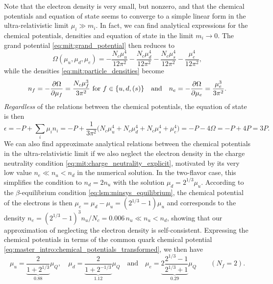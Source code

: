 Note that the electron density is very small, but nonzero,
and that the chemical potentials and equation of state seems to converge to a simple linear form in the ultra-relativistic limit $\mu_i \gg m_i$.
In fact, we can find analytical expressions for the chemical potentials, densities and equation of state in the limit $m_i \rightarrow 0$.
The grand potential \eqref{eq:mit:grand_potential} then reduces to
\begin{equation}
	\Omega(\mu_u, \mu_d, \mu_e) = -\frac{N_c \mu_u^4}{12 \pi^2} - \frac{N_c \mu_d^4}{12 \pi^2} - \frac{N_c \mu_s^4}{12 \pi^2} - \frac{\mu_e^4}{12 \pi^2},
\label{eq:mit:grand_potential_massless}
\end{equation}
while the densities \eqref{eq:mit:particle_densities} become
\begin{equation}
	n_f = -\pdv{\Omega}{\mu_f} = \frac{N_c \mu_f^3}{3 \pi^2}
	\text{ for $f \in \{u,d,(s)\}$}
	\quad \text{and} \quad
	n_e = -\pdv{\Omega}{\mu_e} = \frac{    \mu_e^3}{3 \pi^2}.
\label{eq:lsm:densities_massless}
\end{equation}
\emph{Regardless} of the relations between the chemical potentials,
the equation of state is then
\begin{equation}
	\epsilon = -P + \sum_i \mu_i n_i
	         = -P + \frac{1}{3 \pi^2} \Big(N_c \mu_u^4 + N_c \mu_d^4 + N_c \mu_s^4 + \mu_e^4\Big)
	         = -P - 4 \Omega 
	         = -P + 4 P 
	         = 3 P .
\label{eq:mit:eos_ur}
\end{equation}
We can also find approximate analytical relations between the chemical potentials in the ultra-relativistic limit
if we also neglect the electron density in the charge neutrality condition \eqref{eq:mit:charge_neutrality_explicit},
motivated by its very low value $n_e \ll n_u < n_d$ in the numerical solution.
In the two-flavor case, this simplifies the condition to $n_d = 2 n_u$ with the solution $\mu_d = 2^{1/3} \mu_u$.
According to the $\beta$-equilibrium condition \eqref{eq:lsm:minsys_equilibrium},
the chemical potential of the electrons is then $\mu_e = \mu_d - \mu_u = (2^{1/3}-1) \mu_u$
and corresponds to the density $n_e = (2^{1/3}-1)^3 n_u / N_c = 0.006 \, n_u \ll n_u < n_d$,
showing that our approximation of neglecting the electron density is self-consistent.
Expressing the chemical potentials in terms of the common quark chemical potential \eqref{eq:master_intro:chemical_potentials_transformed},
we then have
\begin{equation}
	\mu_u = \underbrace{\frac{2}{1+2^{1/3}}}_{0.88} \mu_Q , \quad
	\mu_d = \underbrace{\frac{2}{1+2^{-1/3}}}_{1.12} \mu_Q \quad \text{and} \quad
	\mu_e = \underbrace{2 \frac{2^{1/3}-1}{2^{1/3}+1}}_{0.29} \mu_Q
	\qquad (N_f = 2) .
\label{eq:mit:chemical_potentials_massless_2f}
\end{equation}
